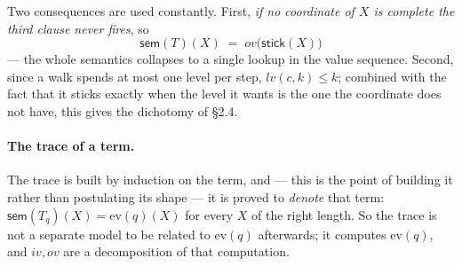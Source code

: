 \documentclass[11pt]{article}
\newcommand{\ev}{\mathrm{ev}}
\newcommand{\ovv}{\mathit{ov}}
\newcommand{\ivv}{\mathit{iv}}
\newcommand{\lvv}{\mathit{lv}}
\newcommand{\stick}{\mathsf{stick}}
\newcommand{\sem}{\mathsf{sem}}
\theoremstyle{definition}
\begin{document}
Two consequences are used constantly. First, \emph{if no coordinate of $X$
is complete the third clause never fires}, so
\begin{equation}
\label{eq:collapse}
\sem(T)(X) \;=\; \ovv\bigl(\stick(X)\bigr)
\end{equation}
--- the whole semantics collapses to a single lookup in the value
sequence. Second, since a walk spends at most one level per step,
$\lvv(c,k) \le k$; combined with the fact that it sticks exactly when the
level it wants is the one the coordinate does not have, this gives the
dichotomy of \S2.4.

\paragraph{The trace of a term.} The trace is built by induction on the
term, and --- this is the point of building it rather than postulating its
shape --- it is proved to \emph{denote} that term: $\sem(T_q)(X) = \ev(q)(X)$
for every $X$ of the right length. So the trace is not a separate model to
be related to $\ev(q)$ afterwards; it computes $\ev(q)$, and $\ivv,\ovv$
are a decomposition of that computation.
\end{document}
